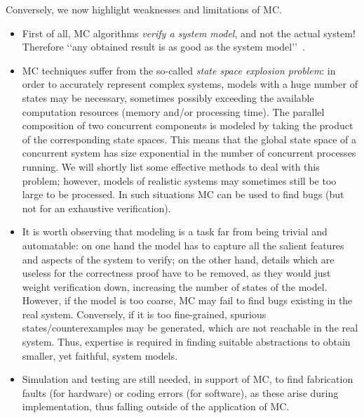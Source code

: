 Conversely, we now highlight weaknesses and limitations of MC.
\begin{itemize}
    \item  First of all, MC algorithms \emph{verify a system model}, and not the actual system! Therefore \lq\lq any obtained result is as good as the system model\rq\rq{}~\cite{Baier2008}. 
    \item MC techniques suffer from the so-called \emph{state space explosion problem}:
    in order to accurately represent complex systems, models with a huge number of states may be necessary, sometimes possibly exceeding the available computation resources (memory and/or processing time). 
    The parallel composition of two concurrent components is modeled by taking the product of the corresponding state spaces. This means that the global state space of a concurrent system has size exponential in the number of concurrent processes running. 
    We will shortly list some effective methods to deal with this problem; %
    however,
	models of realistic systems may sometimes still be too large to be processed.
	In such situations MC can be used to find bugs (but not for an exhaustive verification).
	\item It is worth observing that modeling is a task far from being trivial and automatable: on one hand the model has to capture all the salient features and aspects of the system to verify; on the other hand, details which are useless for the correctness proof have to be removed, as they would just weight verification down, increasing the number of states of the model. However, if the model is too coarse, MC may fail to find bugs existing in the real system. Conversely, if it is too fine-grained, spurious states/counterexamples may be generated, which are not reachable in the real system.
	Thus, expertise is required in finding suitable abstractions to obtain smaller, yet faithful, system models. %
    \item Simulation and testing are still needed, in support of MC, to find fabrication faults (for hardware) or coding errors (for software), as these arise during implementation, thus falling outside of the application of MC.

\end{itemize}
